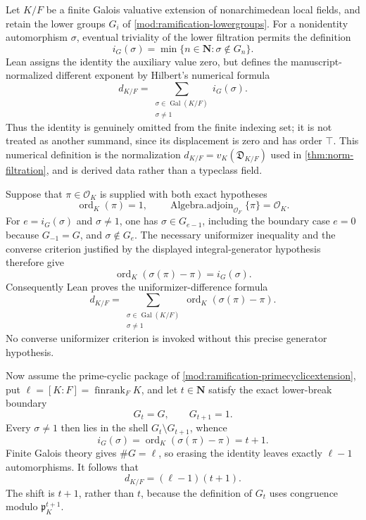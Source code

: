\begin{theorem}\label{mod:ramification-different}
Let $K/F$ be a finite Galois valuative extension of nonarchimedean local
fields, and retain the lower groups $G_i$ of
\ref{mod:ramification-lowergroups}.  For a nonidentity automorphism
$\sigma$, eventual triviality of the lower filtration permits the definition
\[
 i_G(\sigma)=\min\{n\in\mathbf N:\sigma\notin G_n\}.
\]
Lean assigns the identity the auxiliary value zero, but defines the
manuscript-normalized different exponent by Hilbert's numerical formula
\[
 d_{K/F}=\sum_{\substack{\sigma\in\operatorname{Gal}(K/F)\\
                          \sigma\ne1}}i_G(\sigma).
\]
Thus the identity is genuinely omitted from the finite indexing set; it is
not treated as another summand, since its displacement is zero and has order
$\top$.  This numerical definition is the normalization
$d_{K/F}=v_K(\mathfrak D_{K/F})$ used in
\ref{thm:norm-filtration}, and is derived data rather than a typeclass field.

Suppose that $\pi\in\mathcal O_K$ is supplied with both exact hypotheses
\[
 \operatorname{ord}_K(\pi)=1,
 \qquad
 \operatorname{Algebra.adjoin}_{\mathcal O_F}\{\pi\}=\mathcal O_K.
\]
For $e=i_G(\sigma)$ and $\sigma\ne1$, one has
$\sigma\in G_{e-1}$, including the boundary case $e=0$ because
$G_{-1}=G$, and $\sigma\notin G_e$.  The necessary uniformizer inequality
and the converse criterion justified by the displayed integral-generator
hypothesis therefore give
\[
 \operatorname{ord}_K(\sigma(\pi)-\pi)=i_G(\sigma).
\]
Consequently Lean proves the uniformizer-difference formula
\[
 d_{K/F}
 =\sum_{\substack{\sigma\in\operatorname{Gal}(K/F)\\
                   \sigma\ne1}}
   \operatorname{ord}_K(\sigma(\pi)-\pi).
\]
No converse uniformizer criterion is invoked without this precise generator
hypothesis.

Now assume the prime-cyclic package of
\ref{mod:ramification-primecyclicextension}, put
$\ell=[K:F]=\operatorname{finrank}_F K$, and let $t\in\mathbf N$ satisfy
the exact lower-break boundary
\[
 G_t=G,\qquad G_{t+1}=1.
\]
Every $\sigma\ne1$ then lies in the shell $G_t\setminus G_{t+1}$, whence
\[
 i_G(\sigma)
 =\operatorname{ord}_K(\sigma(\pi)-\pi)=t+1.
\]
Finite Galois theory gives $\#G=\ell$, so erasing the identity leaves exactly
$\ell-1$ automorphisms.  It follows that
\[
 \boxed{d_{K/F}=(\ell-1)(t+1).}
\]
The shift is $t+1$, rather than $t$, because the definition of $G_t$ uses
congruence modulo $\mathfrak p_K^{t+1}$.


\end{theorem}
